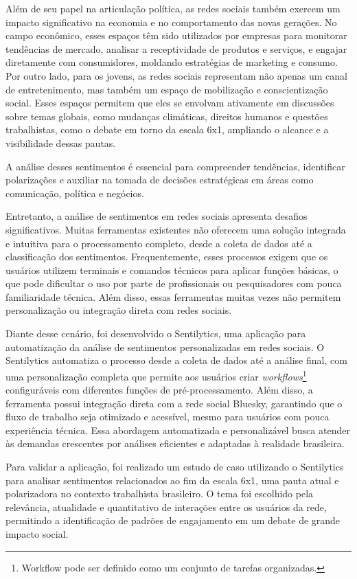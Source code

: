 \documentclass[
	12pt,				%
	oneside,			%
	a4paper,			%
	english,			%
	french,				%
	spanish,			%
	brazil				%
	]{abntex2}
\begin{document}
Além de seu papel na articulação política, as redes sociais também
exercem um impacto significativo na economia e no comportamento das
novas gerações. No campo econômico, esses espaços têm sido utilizados
por empresas para monitorar tendências de mercado, analisar a
receptividade de produtos e serviços, e engajar diretamente com
consumidores, moldando estratégias de marketing e consumo. Por outro
lado, para os jovens, as redes sociais representam não apenas um canal
de entretenimento, mas também um espaço de mobilização e conscientização
social. Esses espaços permitem que eles se envolvam ativamente em
discussões sobre temas globais, como mudanças climáticas, direitos
humanos e questões trabalhistas, como o debate em torno da escala 6x1,
ampliando o alcance e a visibilidade dessas pautas.

A análise desses sentimentos é essencial para compreender tendências,
identificar polarizações e auxiliar na tomada de decisões estratégicas
em áreas como comunicação, política e negócios.

Entretanto, a análise de sentimentos em redes sociais apresenta desafios
significativos. Muitas ferramentas existentes não oferecem uma solução
integrada e intuitiva para o processamento completo, desde a coleta de
dados até a classificação dos sentimentos. Frequentemente, esses
processos exigem que os usuários utilizem terminais e comandos técnicos
para aplicar funções básicas, o que pode dificultar o uso por parte de
profissionais ou pesquisadores com pouca familiaridade técnica. Além
disso, essas ferramentas muitas vezes não permitem personalização ou
integração direta com redes sociais.

Diante desse cenário, foi desenvolvido o Sentilytics, uma aplicação para
automatização da análise de sentimentos personalizadas em redes sociais.
O Sentilytics automatiza o processo desde a coleta de dados até a
análise final, com uma personalização completa que permite aos usuários
criar \emph{workflows}\footnote{Workflow pode ser definido como um
  conjunto de tarefas organizadas.} configuráveis com diferentes funções
de pré-processamento. Além disso, a ferramenta possui integração direta
com a rede social Bluesky, garantindo que o fluxo de trabalho seja
otimizado e acessível, mesmo para usuários com pouca experiência
técnica. Essa abordagem automatizada e personalizável busca atender às
demandas crescentes por análises eficientes e adaptadas à realidade
brasileira.

Para validar a aplicação, foi realizado um estudo de caso utilizando o
Sentilytics para analisar sentimentos relacionados ao fim da escala 6x1,
uma pauta atual e polarizadora no contexto trabalhista brasileiro. O
tema foi escolhido pela relevância, atualidade e quantitativo de
interações entre os usuários da rede, permitindo a identificação de
padrões de engajamento em um debate de grande impacto social.
\end{document}
